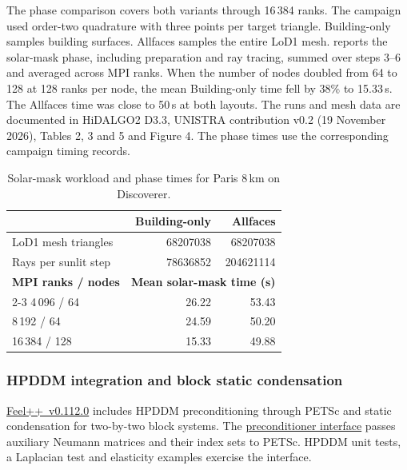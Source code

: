 The phase comparison covers both variants through 16\,384 ranks.
The campaign used order-two quadrature with three points per
target triangle. Building-only samples building surfaces. Allfaces samples
the entire LoD1 mesh.  reports the
solar-mask phase, including preparation and ray tracing, summed over
steps 3--6 and averaged across MPI ranks. When the number of nodes doubled
from 64 to 128 at 128 ranks per node, the mean Building-only time fell by
38\% to 15.33\,s. The Allfaces time was close to 50\,s at both layouts.
The runs and mesh data are documented in HiDALGO2 D3.3, UNISTRA
contribution v0.2 (19 November 2026), Tables 2, 3 and 5 and Figure 4.
The phase times use the corresponding campaign timing records.

\begin{table}[H]
  \centering
  \small
  \caption{Solar-mask workload and phase times for Paris 8\,km on Discoverer.}
  \label{tab:Feelpp:solar-mask-discoverer}
  \begin{tabular}{@{}lrr@{}}
    \toprule
    & \textbf{Building-only} & \textbf{Allfaces} \\
    \midrule
    LoD1 mesh triangles & \num{68207038} & \num{68207038} \\
    Rays per sunlit step & \num{78636852} & \num{204621114} \\
    \midrule
    \textbf{MPI ranks / nodes} & \multicolumn{2}{c}{\textbf{Mean solar-mask time (s)}} \\
    \cmidrule(l){2-3}
    4\,096 / 64    & 26.22 & 53.43 \\
    8\,192 / 64    & 24.59 & 50.20 \\
    16\,384 / 128  & 15.33 & 49.88 \\
    \bottomrule
  \end{tabular}
\end{table}

\subsubsection{HPDDM integration and block static condensation}
\label{sec:Feelpp:implementation-2026:solvers}
\href{https://github.com/feelpp/feelpp/releases/tag/v0.112.0}{Feel++~v0.112.0}
includes HPDDM preconditioning through PETSc and static condensation for
two-by-two block systems. The
\href{https://github.com/feelpp/feelpp/blob/v0.112.0/feelpp/feel/feelalg/preconditionerpetsc.hpp}{preconditioner interface}
passes auxiliary Neumann matrices and their index sets to PETSc.
HPDDM unit tests, a Laplacian test and elasticity examples exercise the
interface.

